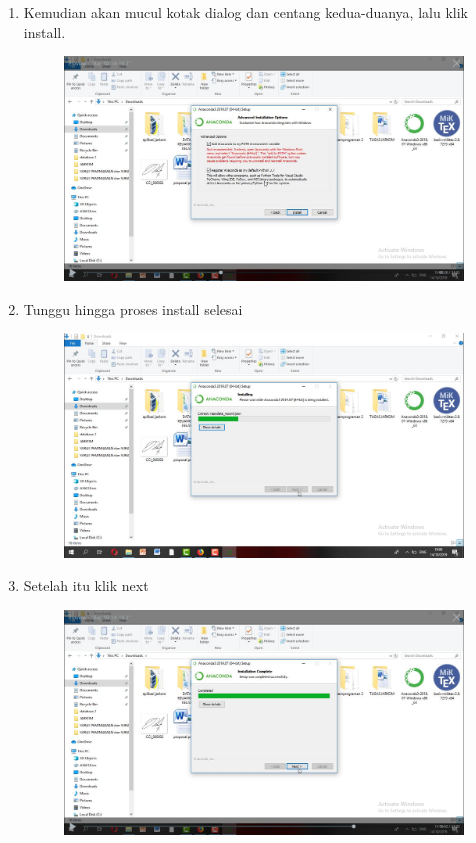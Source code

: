 \begin{enumerate}
\begin{figure}[h]
    \caption{}
    \label{fig:my_label}
\end{figure}
\item  Kemudian akan mucul kotak dialog dan centang kedua-duanya, lalu klik install.
\begin{figure}[h]
    \centering
    \includegraphics[scale=0.2]{gambar/6.png}
    \caption{}
    \label{fig:my_label}
\end{figure}
\item  Tunggu hingga proses install selesai
\begin{figure}[h]
    \centering
    \includegraphics[scale=0.2]{gambar/7.png}
    \caption{}
    \label{fig:my_label}
\end{figure}
\item  Setelah itu klik next
\begin{figure}[h]
    \centering
    \includegraphics[scale=0.2]{gambar/8.png}

\end{figure}
\end{enumerate}
